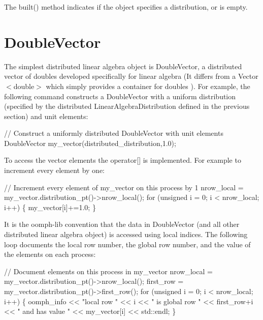 The {\ttfamily built()} method indicates if the object specifies a distribution, or is empty.\hypertarget{index_double_vector}{}\section{Double\+Vector}\label{index_double_vector}
The simplest distributed linear algebra object is {\ttfamily Double\+Vector}, a distributed vector of {\ttfamily doubles} developed specifically for linear algebra (It differs from a {\ttfamily Vector$<$double$>$} which simply provides a container for {\ttfamily doubles} ). For example, the following command constructs a {\ttfamily Double\+Vector} with a uniform distribution (specified by the distributed {\ttfamily Linear\+Algebra\+Distribution} defined in the previous section) and unit elements\+:


\begin{DoxyCodeInclude}
  


  \textcolor{comment}{// Construct a uniformly distributed DoubleVector with unit elements}
  DoubleVector my\_vector(distributed\_distribution,1.0);

\end{DoxyCodeInclude}


To access the vector elements the {\ttfamily operator}\mbox{[}\mbox{]} is implemented. For example to increment every element by one\+:


\begin{DoxyCodeInclude}
  
  \textcolor{comment}{// Increment every element of my\_vector on this process by 1}
  nrow\_local = my\_vector.distribution\_pt()->nrow\_local();
  \textcolor{keywordflow}{for} (\textcolor{keywordtype}{unsigned} i = 0; i < nrow\_local; i++)
   \{
    my\_vector[i]+=1.0;
   \}

\end{DoxyCodeInclude}


It is the {\ttfamily oomph-\/lib} convention that the data in {\ttfamily Double\+Vector} (and all other distributed linear algebra object) is accessed using local indices. The following loop documents the local row number, the global row number, and the value of the elements on each process\+:


\begin{DoxyCodeInclude}
  
  \textcolor{comment}{// Document elements on this process in my\_vector}
  nrow\_local = my\_vector.distribution\_pt()->nrow\_local();
  first\_row = my\_vector.distribution\_pt()->first\_row();
  \textcolor{keywordflow}{for} (\textcolor{keywordtype}{unsigned} i = 0; i < nrow\_local; i++)
   \{
    oomph\_info << \textcolor{stringliteral}{"local row "} << i 
               << \textcolor{stringliteral}{" is global row "} << first\_row+i 
               << \textcolor{stringliteral}{" and has value "} << my\_vector[i] << std::endl; 
   \}

\end{DoxyCodeInclude}


